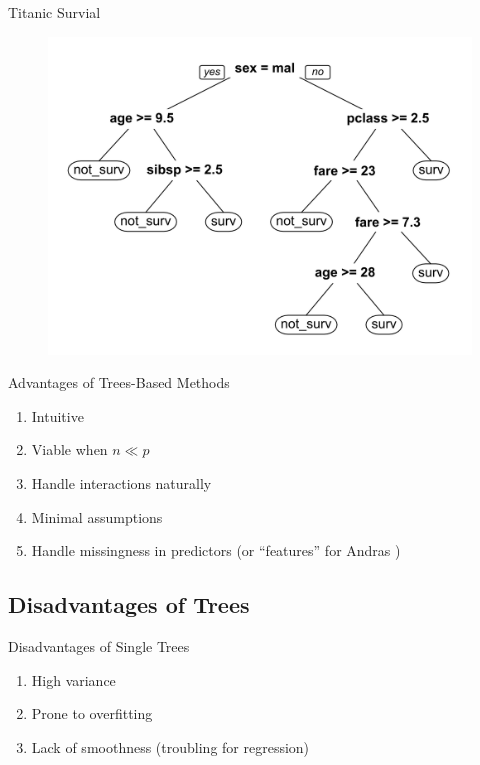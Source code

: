 \documentclass[pdf]{beamer}
\begin{document}
		
		\begin{frame}{Titanic Survial}
			\begin{figure}
				\includegraphics[scale = 0.05]{tree.png}
			\end{figure}		
    		\end{frame}

	
		\begin{frame}{Advantages of Trees-Based Methods}
			\begin{enumerate}
				\item Intuitive
				\item Viable when $n \ll p$
				\item Handle interactions naturally
				\item Minimal assumptions
				\item Handle missingness in predictors (or ``features'' for Andras \smiley)
			\end{enumerate}
		\end{frame}
	
	
	\subsection{Disadvantages of Trees}
		
		\begin{frame}{Disadvantages of Single Trees}
			\begin{enumerate}
				\item High variance
				\item Prone to overfitting
				\item Lack of smoothness (troubling for regression)
			\end{enumerate}
		\end{frame}
		
\end{document}
